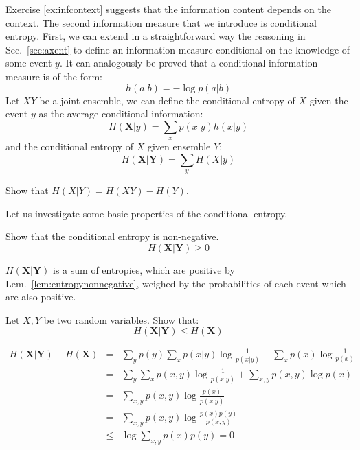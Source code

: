 Exercise \ref{ex:infcontext} suggests that the information content depends on the context. The second information measure that we introduce is conditional entropy.
First, we can extend in a straightforward way the reasoning in Sec.~\ref{sec:axent} to define an information measure conditional on the knowledge of some event $y$. 
It can analogously be proved that a conditional information measure is of the form: 
\begin{equation}
h(a|b) = -\log p (a|b)
\end{equation}
Let $XY$ be a joint ensemble, we can define the conditional entropy of $X$ given the event $y$ as the average conditional information:
\begin{equation}
H(\mathbf{X}|y) = \sum_x p(x|y) h(x|y)
\end{equation}
and the conditional entropy of $X$ given ensemble $Y$:
\begin{equation}
H(\mathbf{X}|\mathbf{Y})=\sum_yH(X|y)
\end{equation}
\begin{exercise}
Show that $H(X|Y)=H(XY)-H(Y)$.
\end{exercise}
Let us investigate some basic properties of the conditional entropy.
\begin{exercise}Show that the conditional entropy is non-negative.
\begin{equation*}
H(\mathbf{X}|\mathbf{Y}) \geq 0
\end{equation*}
\end{exercise}
\begin{solution}
$H(\mathbf{X}|\mathbf{Y})$ is a sum of entropies, which are positive by Lem.~\ref{lem:entropynonnegative}, weighed by the probabilities of each event which are also positive.
\end{solution}

\begin{exercise}
\label{lem:entgeqcond}
Let $X,Y$ be two random variables. Show that:
\begin{equation*}
H(\mathbf{X}|\mathbf{Y}) \leq H(\mathbf{X})
\end{equation*}
\end{exercise}
\begin{solution}
\begin{eqnarray}
H(\mathbf{X}|\mathbf{Y}) - H(\mathbf{X}) &=& \sum_{y }p(y) \sum_{x} p(x|y)\log \frac{1}{p(x|y)} - \sum_{x}p(x) \log  \frac{1}{p(x)}\nonumber \\
                         &=& \sum_{y}\sum_{x}p(x,y) \log \frac{1}{p(x|y)} + \sum_{x,y}p(x,y) \log  p(x) \nonumber \\
                         &=& \sum_{x,y}p(x,y) \log  \frac{p(x)}{p(x|y)} \nonumber \\
                         &=& \sum_{x,y}p(x,y) \log  \frac{p(x)p(y)}{p(x,y)} \nonumber \\
                         &\leq & \log \sum_{x,y} p(x) p(y) = 0
\end{eqnarray}
\end{solution}

